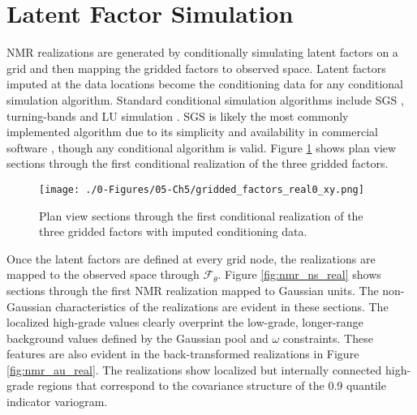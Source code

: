 \FloatBarrier
\section{Latent Factor Simulation}
\label{sec:05latentsim}

\gls{NMR} realizations are generated by conditionally simulating latent factors on a grid and then mapping the gridded factors to observed space. Latent factors imputed at the data locations become the conditioning data for any conditional simulation algorithm. Standard conditional simulation algorithms include \gls{SGS} \citep{gomez-hernandez1993joint}, turning-bands \citep{journel1974geostatistics} and LU simulation \citep{davis1987production}. \gls{SGS} is likely the most commonly implemented algorithm due to its simplicity and availability in commercial software \citep{rossi2013mineral}, though any conditional algorithm is valid. Figure \ref{fig:gridded_factors_real0_xy} shows plan view sections through the first conditional realization of the three gridded factors.

\begin{figure}[htb!]
    \centering
    \texttt{[image: ./0-Figures/05-Ch5/gridded\_factors\_real0\_xy.png]}
    \caption{Plan view sections through the first conditional realization of the three gridded factors with imputed conditioning data.}
    \label{fig:gridded_factors_real0_xy}
\end{figure}

Once the latent factors are defined at every grid node, the realizations are mapped to the observed space through $\mathcal{F}_{\theta}$. Figure \ref{fig:nmr_ns_real} shows sections through the first \gls{NMR} realization mapped to Gaussian units. The non-Gaussian characteristics of the realizations are evident in these sections. The localized high-grade values clearly overprint the low-grade, longer-range background values defined by the Gaussian pool and $\omega$ constraints. These features are also evident in the back-transformed realizations in Figure \ref{fig:nmr_au_real}. The realizations show localized but internally connected high-grade regions that correspond to the covariance structure of the 0.9 quantile indicator variogram.

